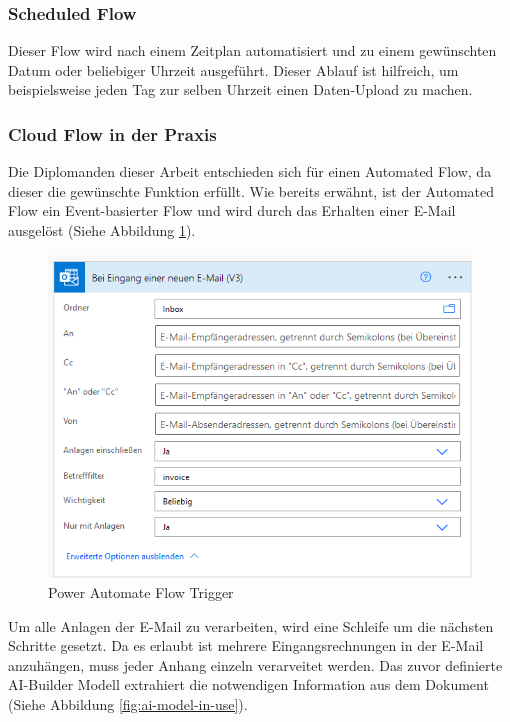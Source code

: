 \subsubsection{Scheduled Flow}
Dieser Flow wird nach einem Zeitplan automatisiert und zu einem gewünschten Datum oder beliebiger Uhrzeit ausgeführt. Dieser Ablauf ist hilfreich, um beispielsweise jeden Tag zur selben Uhrzeit einen Daten-Upload zu machen.

\subsubsection{Cloud Flow in der Praxis}
Die Diplomanden dieser Arbeit entschieden sich für einen Automated Flow, da dieser die gewünschte Funktion erfüllt. Wie bereits erwähnt, ist der Automated Flow ein Event-basierter Flow und wird durch das Erhalten einer E-Mail ausgelöst (Siehe Abbildung \ref{fig:flow-trigger}).

\begin{figure}[h]
    \centering
    \includegraphics[scale=0.9]{sections/cloud-computing/images/power-automate-flow/trigger.png}
    \caption{Power Automate Flow Trigger}
    \label{fig:flow-trigger}
\end{figure}

Um alle Anlagen der E-Mail zu verarbeiten, wird eine Schleife um die nächsten Schritte gesetzt. Da es erlaubt ist mehrere Eingangsrechnungen in der E-Mail anzuhängen, muss jeder Anhang einzeln verarveitet werden. Das zuvor definierte AI-Builder Modell extrahiert die notwendigen Information aus dem Dokument (Siehe Abbildung \ref{fig:ai-model-in-use}).

